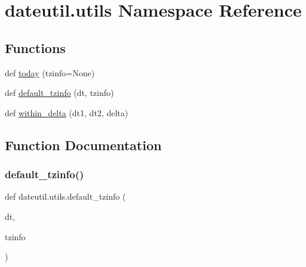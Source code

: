 \hypertarget{namespacedateutil_1_1utils}{}\section{dateutil.\+utils Namespace Reference}
\label{namespacedateutil_1_1utils}
\subsection*{Functions}
\begin{DoxyCompactItemize}
\item 
def \hyperlink{namespacedateutil_1_1utils_ab4fd4b6f7d7b12a852d640ff84aa9191}{today} (tzinfo=None)
\item 
def \hyperlink{namespacedateutil_1_1utils_af76b90a36fb854817eff3c4749709942}{default\+\_\+tzinfo} (dt, tzinfo)
\item 
def \hyperlink{namespacedateutil_1_1utils_a6cae45aff4256b0744d058258dc3863a}{within\+\_\+delta} (dt1, dt2, delta)
\end{DoxyCompactItemize}


\subsection{Function Documentation}
\mbox{\label{namespacedateutil_1_1utils_af76b90a36fb854817eff3c4749709942}} 
\subsubsection{\texorpdfstring{default\+\_\+tzinfo()}{default\_tzinfo()}}
{\footnotesize\ttfamily def dateutil.\+utils.\+default\+\_\+tzinfo (\begin{DoxyParamCaption}\item[{}]{dt,  }\item[{}]{tzinfo }\end{DoxyParamCaption})}

